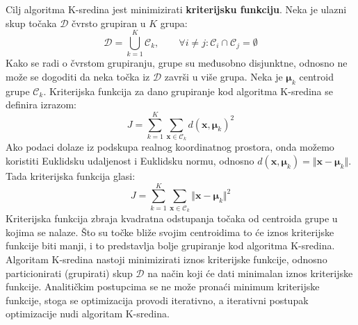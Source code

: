 \documentclass[times, utf8, zavrsni]{fer}
\begin{document}
Cilj algoritma K-sredina jest minimizirati \textbf{kriterijsku funkciju}. Neka je ulazni skup točaka $\mathcal{D}$ čvrsto grupiran u $K$ grupa:
\[\mathcal{D} = \bigcup_{k=1}^{K} \mathcal{C}_k, \qquad \forall i \neq j :  \mathcal{C}_i \cap \mathcal{C}_j = \emptyset\]
Kako se radi o čvrstom grupiranju, grupe su međusobno disjunktne, odnosno ne može se dogoditi da neka točka iz $\mathcal{D}$ završi u više grupa. Neka je $\boldsymbol{\mu}_k$ centroid grupe $\mathcal{C}_k$. Kriterijska funkcija za dano grupiranje kod algoritma K-sredina se definira izrazom:
\[J = \sum_{k=1}^{K} \sum_{\mathbf{x} \in \mathcal{C}_k} 
d \left(\mathbf{x}, \boldsymbol{\mu}_k\right)^2\]
Ako podaci dolaze iz podskupa realnog koordinatnog prostora, onda možemo koristiti Euklidsku udaljenost i Euklidsku normu, odnosno
$d \left(\mathbf{x}, \boldsymbol{\mu}_k\right) = \Vert \mathbf{x} - \boldsymbol{\mu}_k \Vert$. Tada kriterijska funkcija glasi:
\[J = \sum_{k=1}^{K} \sum_{\mathbf{x} \in \mathcal{C}_k} 
\Vert \mathbf{x} - \boldsymbol{\mu}_k \Vert^2\]
Kriterijska funkcija zbraja kvadratna odstupanja točaka od centroida grupe u kojima se nalaze. Što su točke bliže svojim centroidima to će iznos kriterijske funkcije biti manji, i to predstavlja bolje grupiranje kod algoritma K-sredina. Algoritam K-sredina nastoji minimizirati iznos kriterijske funkcije, odnosno particionirati (grupirati) skup $\mathcal{D}$ na način koji će dati minimalan iznos kriterijske funkcije. Analitičkim postupcima se ne može pronaći minimum kriterijske funkcije, stoga se optimizacija provodi iterativno, a iterativni postupak optimizacije nudi algoritam K-sredina.
\end{document}
